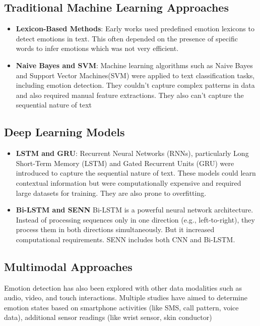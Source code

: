 \documentclass[12pt]{article} %
\begin{document}
\subsection{Traditional Machine Learning Approaches}
\begin{itemize}
    \item \textbf{Lexicon-Based Methods}:
Early works used predefined emotion lexicons to detect emotions in text. This often depended on the presence of specific words to infer emotions which was not very efficient.
\end{itemize}                    
                      
\begin{itemize}
    \item \textbf{Naive Bayes and SVM}:
Machine learning algorithms such as Naive Bayes and Support Vector Machines(SVM)\cite{tang} were applied to text classification tasks, including emotion detection. They couldn't capture complex patterns in data and also required manual feature extractions. They also can't capture the sequential nature of text\cite{transformer}
\end{itemize}
\subsection{Deep Learning Models}
\begin{itemize}
    \item \textbf{LSTM and GRU}:
Recurrent Neural Networks (RNNs)\cite{cho}, particularly Long Short-Term Memory (LSTM)\cite{article} and Gated Recurrent Units (GRU)\cite{dey} were introduced to capture the sequential nature of text. These models could learn contextual information but were computationally expensive and required large datasets for training. They are also prone to overfitting.
\end{itemize}
\begin{itemize}
    \item \textbf{Bi-LSTM and SENN}
Bi-LSTM is a powerful neural network architecture\cite{wei}. Instead of processing sequences only in one direction (e.g., left-to-right), they process them in both directions simultaneously. But it increased computational requirements. SENN includes both CNN and Bi-LSTM\cite{bat}.
\end{itemize}

\subsection{Multimodal Approaches}
Emotion detection has also been explored with other data modalities such as audio, video, and touch interactions\cite{trojan}. Multiple studies have aimed to determine emotion states based on smartphone activities (like SMS, call pattern, voice data)\cite{ciman}, additional sensor readings (like wrist sensor, skin conductor)
\end{document}
